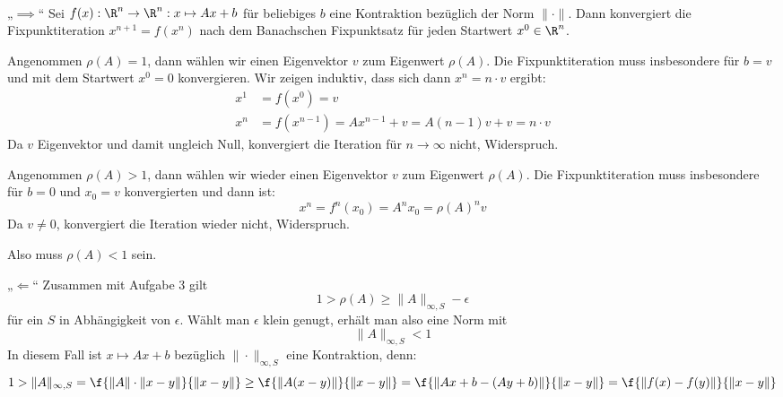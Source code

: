 \documentclass{scrartcl}
\begin{document}
	\begin{aufgabe}~

		\begin{seg}{„$\implies$“}
			Sei $f(x):\R^n\to\R^n:x\mapsto Ax+b$ für beliebiges $b$ eine Kontraktion bezüglich der Norm $\|\cdot\|$.
			Dann konvergiert die Fixpunktiteration $x^{n+1} = f(x^n)$ nach dem Banachschen Fixpunktsatz für jeden Startwert $x^0\in \R^n$.
			
			Angenommen $\rho(A)=1$, dann wählen wir einen Eigenvektor $v$ zum Eigenwert $\rho(A)$.
			Die Fixpunktiteration muss insbesondere für $b=v$ und mit dem Startwert $x^0=0$ konvergieren.
			Wir zeigen induktiv, dass sich dann $x^n=n\cdot v$ ergibt:
			\begin{align*}
				x^1 &= f(x^0) = v\\
				x^n &= f(x^{n-1}) = Ax^{n-1} + v = A(n-1)v + v = n\cdot v
			\end{align*}
			Da $v$ Eigenvektor und damit ungleich Null, konvergiert die Iteration für $n\to\infty$ nicht, Widerspruch.

			Angenommen $\rho(A)>1$, dann wählen wir wieder einen Eigenvektor $v$ zum Eigenwert $\rho(A)$.
			Die Fixpunktiteration muss insbesondere für $b=0$ und $x_0=v$ konvergierten und dann ist:
			\[
				x^n = f^n(x_0) = A^nx_0 = \rho(A)^nv
			\]
			Da $v\neq 0$, konvergiert die Iteration wieder nicht, Widerspruch.

			Also muss $\rho(A)<1$ sein.
		\end{seg}
		\begin{seg}{„$\Longleftarrow$“}
			Zusammen mit Aufgabe 3 gilt
			\[
				1 > \rho(A) \ge \|A\|_{\infty,S} - \epsilon
			\]
			für ein $S$ in Abhängigkeit von $\epsilon$.
			Wählt man $\epsilon$ klein genugt, erhält man also eine Norm mit
			\[
				\|A\|_{\infty,S} < 1
			\]
			In diesem Fall ist $x\mapsto Ax+b$ bezüglich $\|\cdot\|_{\infty,S}$ eine Kontraktion, denn:
			\[
				1 > \|A\|_{\infty,S} = \f{\|A\|\cdot\|x-y\|}{\|x-y\|} \ge \f{\|A(x-y)\|}{\|x-y\|} = \f{\|Ax+b -(Ay+b)\|}{\|x-y\|} = \f{\|f(x)-f(y)\|}{\|x-y\|}
			\]
		\end{seg}

	\end{aufgabe}
\end{document}
